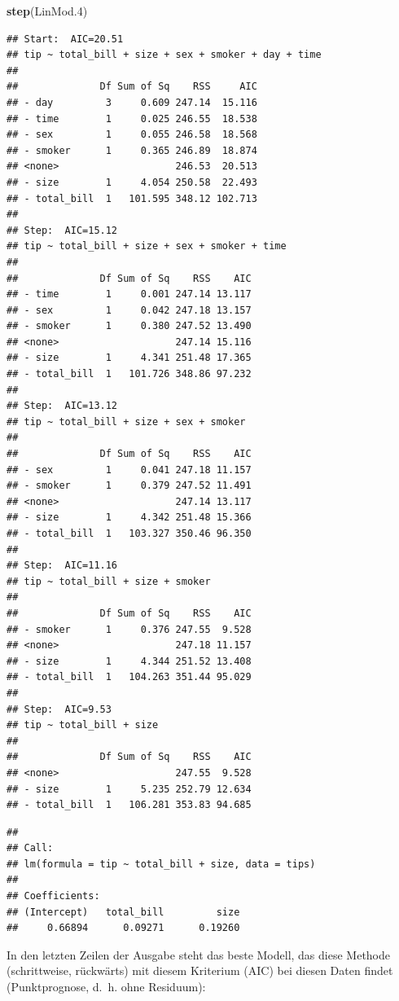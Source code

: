 \documentclass[12pt,ngerman,paper=a4,pagesize,DIV=13]{scrreprt}
\newenvironment{Shaded}{\begin{snugshade}}{\end{snugshade}}
\newcommand{\FloatTok}[1]{\textcolor[rgb]{0.00,0.00,0.81}{#1}}
\newcommand{\KeywordTok}[1]{\textcolor[rgb]{0.13,0.29,0.53}{\textbf{#1}}}
\newcommand{\NormalTok}[1]{#1}
\begin{document}
\begin{Shaded}
\begin{Highlighting}[]
\KeywordTok{step}\NormalTok{(LinMod}\FloatTok{.4}\NormalTok{)}
\end{Highlighting}
\end{Shaded}

\begin{verbatim}
## Start:  AIC=20.51
## tip ~ total_bill + size + sex + smoker + day + time
## 
##              Df Sum of Sq    RSS     AIC
## - day         3     0.609 247.14  15.116
## - time        1     0.025 246.55  18.538
## - sex         1     0.055 246.58  18.568
## - smoker      1     0.365 246.89  18.874
## <none>                    246.53  20.513
## - size        1     4.054 250.58  22.493
## - total_bill  1   101.595 348.12 102.713
## 
## Step:  AIC=15.12
## tip ~ total_bill + size + sex + smoker + time
## 
##              Df Sum of Sq    RSS    AIC
## - time        1     0.001 247.14 13.117
## - sex         1     0.042 247.18 13.157
## - smoker      1     0.380 247.52 13.490
## <none>                    247.14 15.116
## - size        1     4.341 251.48 17.365
## - total_bill  1   101.726 348.86 97.232
## 
## Step:  AIC=13.12
## tip ~ total_bill + size + sex + smoker
## 
##              Df Sum of Sq    RSS    AIC
## - sex         1     0.041 247.18 11.157
## - smoker      1     0.379 247.52 11.491
## <none>                    247.14 13.117
## - size        1     4.342 251.48 15.366
## - total_bill  1   103.327 350.46 96.350
## 
## Step:  AIC=11.16
## tip ~ total_bill + size + smoker
## 
##              Df Sum of Sq    RSS    AIC
## - smoker      1     0.376 247.55  9.528
## <none>                    247.18 11.157
## - size        1     4.344 251.52 13.408
## - total_bill  1   104.263 351.44 95.029
## 
## Step:  AIC=9.53
## tip ~ total_bill + size
## 
##              Df Sum of Sq    RSS    AIC
## <none>                    247.55  9.528
## - size        1     5.235 252.79 12.634
## - total_bill  1   106.281 353.83 94.685
\end{verbatim}

\begin{verbatim}
## 
## Call:
## lm(formula = tip ~ total_bill + size, data = tips)
## 
## Coefficients:
## (Intercept)   total_bill         size  
##     0.66894      0.09271      0.19260
\end{verbatim}

In den letzten Zeilen der Ausgabe steht das beste Modell, das diese
Methode (schrittweise, rückwärts) mit diesem Kriterium (AIC) bei diesen
Daten findet (Punktprognose, d.~h. ohne Residuum):
\end{document}
